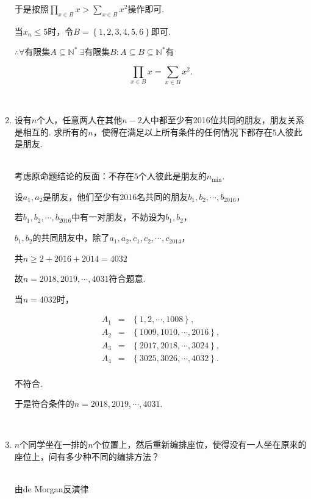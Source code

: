 \documentclass[8pt]{article}
\begin{document}
\begin{enumerate}
			于是按照$\displaystyle{\prod_{x\in B}x>\sum_{x\in B}x^2}$操作即可.

			当$x_n\leq 5$时，令$B=\left\{1,2,3,4,5,6\right\}$即可.

			$\therefore \forall$有限集$A\subseteq \mathbb{N}^{*} \ \exists$有限集$B: A\subseteq B \subseteq \mathbb{N}^{*}$有

			$$\prod_{x\in B}x=\sum_{x\in B}x^2.$$

		~\\

		\item

			设有$n$个人，任意两人在其他$n-2$人中都至少有2016位共同的朋友，朋友关系是相互的. 求所有的$n$，使得在满足以上所有条件的任何情况下都存在$5$人彼此是朋友.

			~\\
			考虑原命题结论的反面：不存在$5$个人彼此是朋友的$n_{\min}$.

			设$a_1, a_2$是朋友，他们至少有$2016$名共同的朋友$b_1, b_2, \cdots, b_{2016}$，

			若$b_1, b_2, \cdots, b_{2016}$中有一对朋友，不妨设为$b_1, b_2$，

			$b_1, b_2$的共同朋友中，除了$a_1, a_2, c_1, c_2, \cdots, c_2014$，

			共$n\geq 2+2016+2014=4032$

			故$n=2018,2019,\cdots,4031$符合题意.

			当$n=4032$时，

			$$
				\begin{array}{rcl}
					A_1&=&\left\{1,2,\cdots,1008\right\},\\
					A_2&=&\left\{1009,1010,\cdots,2016\right\},\\
					A_3&=&\left\{2017,2018,\cdots,3024\right\},\\
					A_4&=&\left\{3025,3026,\cdots,4032\right\}.\\
				\end{array}
			$$

			不符合.

			于是符合条件的$n=2018,2019,\cdots,4031.$
		
		~\\

		\item

			$n$个同学坐在一排的$n$个位置上，然后重新编排座位，使得没有一人坐在原来的座位上，问有多少种不同的编排方法？

			~\\
			由de Morgan反演律


\end{enumerate}
\end{document}
